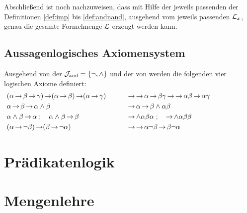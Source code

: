 Abschließend ist noch nachzuweisen, dass mit Hilfe der jeweils passenden der Definitionen \eqref{def:imp} bis \eqref{def:andnand}, ausgehend vom jeweils passenden $\mathcal{L}_x$, genau die gesamte Formelmenge $\mathcal{L}$ erzeugt werden kann.

\subsection{Aussagenlogisches Axiomensystem}%
\label{sub:ausAxiome}

Ausgehend von der  $\mathcal{J}_{\mathrm{and}} = \{\lnot, \land\}$ und der  von \symqt{$\limp$} werden die folgenden vier logischen Axiome definiert:
\begin{align}
	&
	(\alpha\operatorname{\rightarrow}\beta\operatorname{\rightarrow}\gamma)\operatorname{\rightarrow}(\alpha\operatorname{\rightarrow}\beta)\operatorname{\rightarrow}(\alpha\operatorname{\rightarrow}\gamma)
	&&&& &
	& \operatorname{\rightarrow}\operatorname{\rightarrow}\alpha\operatorname{\rightarrow}\beta\gamma\operatorname{\rightarrow}\operatorname{\rightarrow}\alpha\beta\operatorname{\rightarrow}\alpha\gamma \\
	& \alpha \operatorname{\rightarrow} \beta \operatorname{\rightarrow} \alpha \land \beta
	&&&& &
	& \operatorname{\rightarrow} \alpha \operatorname{\rightarrow} \beta \land \alpha \beta \\
	& \alpha \land \beta \operatorname{\rightarrow} \alpha \;; \quad \alpha \land \beta \operatorname{\rightarrow} \beta
	&&&& &
	& \operatorname{\rightarrow} \land \alpha \beta \alpha \;; \quad \operatorname{\rightarrow} \land \alpha \beta \beta\\
	&(\alpha \operatorname{\rightarrow} \lnot \beta) \operatorname{\rightarrow} (\beta \operatorname{\rightarrow} \lnot \alpha)
	&&&& &
	& \operatorname{\rightarrow} \operatorname{\rightarrow} \alpha \lnot \beta \operatorname{\rightarrow} \beta \lnot \alpha
	&&&&&&&&&&
\end{align}
%

\section{Prädikatenlogik}%
\label{sec:Praedikatenlogik}


\section{Mengenlehre}%
\label{sec:Mengenlehre}


\Endchapter
